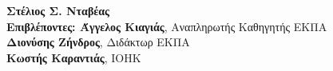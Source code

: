 \begin{center}
    \textbf{\large Στέλιος Σ. Νταβέας} \\
    \vspace{2.5cm}
    \textbf{Επιβλέποντες: Άγγελος Κιαγιάς}, Αναπληρωτής Καθηγητής ΕΚΠΑ\\
    \hspace{0.82cm}
    \textbf{Διονύσης Ζήνδρος}, Διδάκτωρ ΕΚΠΑ\\
    \hspace{-1.15cm}
    \textbf{\large Κωστής Καραντιάς}\large, IOHK

    \vspace{2.0cm}

    \date{\textbf{ΑΘΗΝΑ}, \\ \textbf{ΙΟΥΝΙΟΣ 2020}}
    \pagebreak
\end{center}
